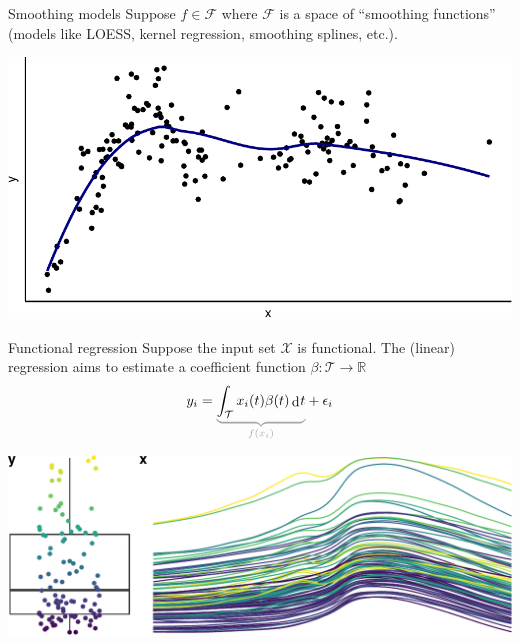 \documentclass[,aspectratio=43]{beamer}
\newcommand{\bbR}{\mathbb{R}}
\newcommand{\cF}{{\mathcal F}}
\newcommand{\cT}{{\mathcal T}}
\newcommand{\cX}{{\mathcal X}}
\newcommand{\myunderbrace}[3][gray!70]{{\color{#1}\underbrace{\color{black}#2}_{#3}}}
\DeclareMathOperator{\dd}{d}
\newcommand{\dint}{\dd\hspace{0.5pt}\!}
\begin{document}
\begin{frame}{Smoothing models}
\protect\hypertarget{smoothing-models}{}
Suppose \(f\in\cF\) where \(\cF\) is a space of ``smoothing functions''
(models like LOESS, kernel regression, smoothing splines, etc.).

\vspace{1em}

\includegraphics{figure/smooth1-1.pdf}
\end{frame}

\begin{frame}{Functional regression}
\protect\hypertarget{functional-regression}{}
Suppose the input set \(\cX\) is functional. The (linear) regression
aims to estimate a coefficient function \(\beta:\cT\to\bbR\) \[
y_i = \myunderbrace{\int_\cT x_i(t)\beta(t) \dint t}{f(x_i)} + \epsilon_i
\]

\includegraphics{figure/functionalx-1.pdf}
\end{frame}
\end{document}
